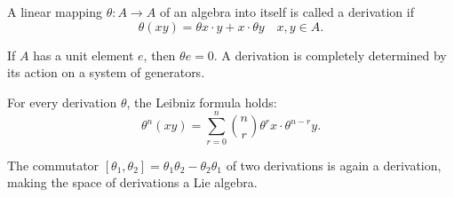 A linear mapping $\theta: A \to A$ of an algebra into itself is called a derivation if
$$\theta(xy) = \theta x \cdot y + x \cdot \theta y \quad x, y \in A.$$

If $A$ has a unit element $e$, then $\theta e = 0$. A derivation is completely determined by its action on a system of generators.

For every derivation $\theta$, the Leibniz formula holds:
$$\theta^n(xy) = \sum_{r=0}^{n} \binom{n}{r} \theta^r x \cdot \theta^{n-r} y.$$

The commutator $[\theta_1, \theta_2] = \theta_1\theta_2 - \theta_2\theta_1$ of two derivations is again a derivation, making the space of derivations a Lie algebra.
